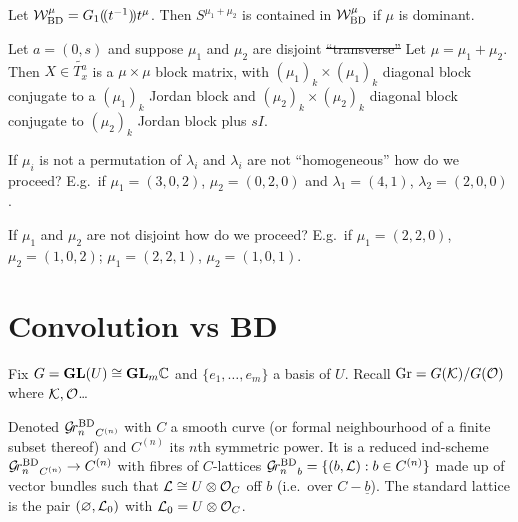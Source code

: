 \documentclass{article}
\newcommand{\anne}[2]{\colorbox{pink!75!blue}{#1}\marginpar[]{\tiny\textbf{\color{pink!50!blue}#2}}}
\begin{document}
\begin{claim}
Let $\cW^\mu_{\rm BD} = G_1\xT[t^{-1}]t^\mu$. Then $S^{\mu_1 + \mu_2}$ is contained in $\cW^\mu_{\rm BD}$ if $\mu$ is dominant.  
\end{claim}

\begin{claim}
Let $a = (0,s)$ and suppose $\mu_1$ and $\mu_2$ are disjoint \sout{``transverse''} 
Let $\mu = \mu_1 + \mu_2$. Then $X\in\widetilde{T_x^a}$ is a $\mu\times\mu$ block matrix, with $(\mu_1)_k\times(\mu_1)_k$ diagonal block conjugate to a $(\mu_1)_k$ Jordan block and $(\mu_2)_k\times (\mu_2)_k$ diagonal block conjugate to $(\mu_2)_k$ Jordan block plus $sI$.
\end{claim}

\begin{question}
If $\mu_i$ is not a permutation of $\lambda_i$ and $\lambda_i$ are not ``homogeneous'' how do we proceed? E.g.\ if $\mu_1 = (3,0,2)$, $\mu_2 = (0,2,0)$ and $\lambda_1 = (4,1)$, $\lambda_2 = (2,0,0)$. 
\end{question}

\begin{question}
If $\mu_1$ and $\mu_2$ are not disjoint how do we proceed? E.g.\ if $\mu_1 = (2,2,0)$, $\mu_2 = (1,0,2)$; $\mu_1 = (2,2,1)$, $\mu_2 = (1,0,1)$.
\end{question}

\section{Convolution vs BD}

Fix $G = \GL(U) \cong \GL_m\CC$ and $\{e_1,\dots,e_m\}$ a basis of $U$. 
% 
Recall $\Gr = G(\cK) / G(\cO)$ where $\cK,\cO$\dots

\begin{definition}
    Denoted $\Grbd_{C^{(n)}}$ with $C$ a smooth curve (or formal neighbourhood of a finite subset thereof) and $C^{(n)}$ its $n$th symmetric power. It is a reduced ind-scheme $\Grbd_{C^{(n)}}\to C^{(n)}$ with fibres of $C$-lattices $\Grbd_b = \{(b,\cL) : b \in C^{(n)}\}$ made up of vector bundles \anne{such that}{Not sure what $\cO_C$ means} $\cL \cong U\otimes\cO_C$ off $b$ (i.e.\ over $C - \underline b$). The standard \anne{lattice}{Notation} is the pair $(\varnothing,\cL_0)$ with $\cL_0 = U\otimes \cO_C$. 
\end{definition}
\end{document}
